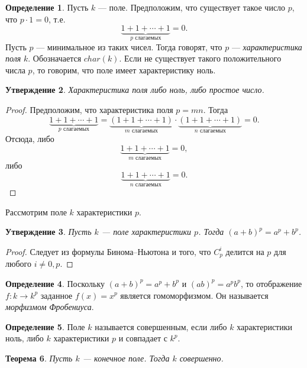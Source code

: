 \documentclass[12pt, titlepage, oneside]{amsbook}
\newtheorem{theorem}{Теорема}[chapter]
\newtheorem{claim}[theorem]{Утверждение}
\theoremstyle{definition}
\newtheorem{definition}[theorem]{Определение}
\theoremstyle{remark}
\begin{document}
\begin{definition}
	Пусть $k$ --- поле. Предположим, что существует такое число $p$, что $p\cdot 1=0$, т.е. $$\underbrace{1+1+\cdots+1}_{\text{$p$ слагаемых}}=0.$$ Пусть $p$ --- минимальное из таких чисел. Тогда говорят, что $p$ --- \emph{характеристика поля} $k$. Обозначается $char(k)$. Если не существует такого положительного числа $p$, то говорим, что поле имеет характеристику ноль.
\end{definition}

\begin{claim}
	\label{Har1}
	Характеристика поля либо ноль, либо простое число.
\end{claim}

\begin{proof}
	Предположим, что характеристика поля $p=mn$. Тогда $$\underbrace{1+1+\cdots+1}_{\text{$p$ слагаемых}}=\underbrace{(1+1+\cdots+1)}_{\text{$m$ слагаемых}}\cdot\underbrace{(1+1+\cdots+1)}_{\text{$n$ слагаемых}}=0.$$ Отсюда, либо $$\underbrace{1+1+\cdots+1}_{\text{$m$ слагаемых}}=0,$$ либо $$\underbrace{1+1+\cdots+1}_{\text{$n$ слагаемых}}=0.$$
\end{proof}

Рассмотрим поле $k$ характеристики $p$.

\begin{claim}
	\label{Har2}
	Пусть $k$ --- поле характеристики $p$. Тогда $(a+b)^p=a^p+b^p$.
\end{claim}

\begin{proof}
	Следует из формулы Бинома--Ньютона и того, что $C_p^i$ делится на $p$ для любого $i\neq 0,p$.
\end{proof}

\begin{definition}
	Поскольку $(a+b)^p=a^p+b^p$ и $(ab)^p=a^p b^p$, то отображение $f\colon k\rightarrow k^p$ заданное $f(x)=x^p$ является гомоморфизмом. Он называется \emph{морфизмом Фробениуса}.
\end{definition}

\begin{definition}
	Поле $k$ называется совершенным, если либо $k$ характеристики ноль, либо $k$ характеристики $p$ и совпадает с $k^p$.
\end{definition}

\begin{theorem}
	\label{Sov}
	Пусть $k$ --- конечное поле. Тогда $k$ совершенно.
\end{theorem}
\end{document}
